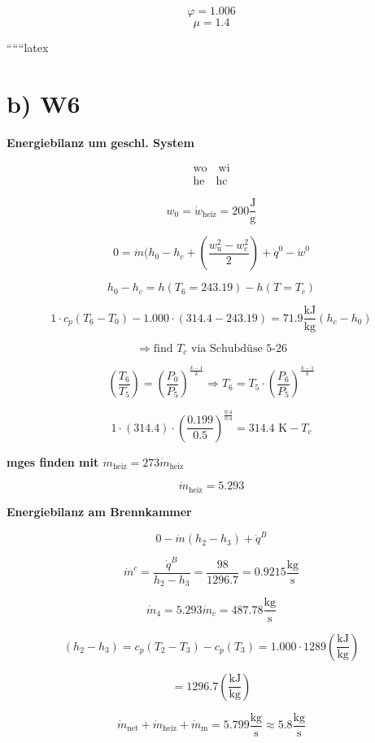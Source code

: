 \[
\varphi = 1.006
\]
\[
\mu = 1.4
\]

``````latex


\section*{b) W6}

\textbf{Energiebilanz um geschl. System}

\[
\begin{array}{c}
\boxed{\text{wo}} \quad \boxed{\text{wi}} \\
\boxed{\text{he}} \quad \boxed{\text{hc}}
\end{array}
\]

\[
w_0 = \dot{w}_{\text{heiz}} = 200 \frac{\text{J}}{\text{g}}
\]

\[
0 = \dot{m} (h_0 - h_c + \left( \frac{w_{\text{u}}^2 - w_{\text{c}}^2}{2} \right) + \dot{q}^0 - \dot{w}^0
\]

\[
h_0 - h_c = h(T_6 = 243.19) - h(T = T_c)
\]

\[
1 \cdot c_p (T_6 - T_0) - 1.000 \cdot (314.4 - 243.19) = 71.9 \frac{\text{kJ}}{\text{kg}} \left( h_c - h_0 \right)
\]

\[
\Rightarrow \text{find } T_c \text{ via Schubdüse 5-26}
\]

\[
\left( \frac{T_6}{T_5} \right) = \left( \frac{P_0}{P_5} \right)^{\frac{k-1}{k}} \Rightarrow T_6 = T_5 \cdot \left( \frac{P_6}{P_5} \right)^{\frac{k-1}{k}}
\]

\[
1 \cdot (314.4) \cdot \left( \frac{0.199}{0.5} \right)^{\frac{0.4}{0.4}} = 314.4 \text{ K} - T_c
\]

\textbf{mges finden mit $\dot{m}_{\text{heiz}} = 273 \dot{m}_{\text{heiz}}$}

\[
\dot{m}_{\text{heiz}} = 5.293
\]

\textbf{Energiebilanz am Brennkammer}

\[
0 - \dot{m} (h_2 - h_3) + \dot{q}^B
\]

\[
\dot{m}^c = \frac{\dot{q}^B}{h_2 - h_3} = \frac{98}{1296.7} = 0.9215 \frac{\text{kg}}{\text{s}}
\]

\[
\dot{m}_4 = 5.293 \dot{m}_c = 487.78 \frac{\text{kg}}{\text{s}}
\]

\[
(h_2 - h_3) = c_p (T_2 - T_3) - c_p (T_3) = 1.000 \cdot 1289 \left( \frac{\text{kJ}}{\text{kg}} \right)
\]

\[
= 1296.7 \left( \frac{\text{kJ}}{\text{kg}} \right)
\]

\[
\dot{m}_{\text{net}} + \dot{m}_{\text{heiz}} + \dot{m}_{\text{m}} = 5.799 \frac{\text{kg}}{\text{s}} \approx 5.8 \frac{\text{kg}}{\text{s}}
\]

